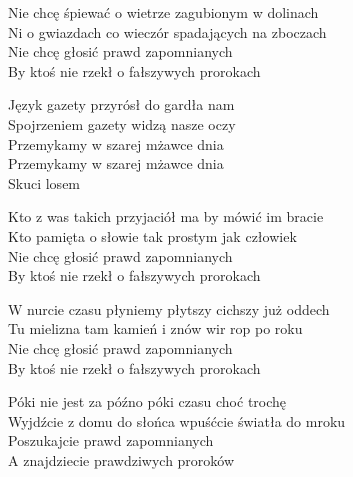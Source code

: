 
\begin{text}
    Nie chcę śpiewać o wietrze zagubionym w dolinach\\
    Ni o gwiazdach co wieczór spadających na zboczach\\
    Nie chcę głosić prawd zapomnianych\\
    By ktoś nie rzekł o fałszywych prorokach

    \vin Język gazety przyrósł do gardła nam\\
    \vin Spojrzeniem gazety widzą nasze oczy\\
    \vin Przemykamy w szarej mżawce dnia\\
    \vin Przemykamy w szarej mżawce dnia\\
    \vin Skuci losem

    Kto z was takich przyjaciół ma by mówić im bracie\\
    Kto pamięta o słowie tak prostym jak człowiek\\
    Nie chcę głosić prawd zapomnianych\\
    By ktoś nie rzekł o fałszywych prorokach

    W nurcie czasu płyniemy płytszy cichszy już oddech\\
    Tu mielizna tam kamień i znów wir rop po roku\\
    Nie chcę głosić prawd zapomnianych\\
    By ktoś nie rzekł o fałszywych prorokach

    Póki nie jest za późno póki czasu choć trochę\\
    Wyjdźcie z domu do słońca wpuśćcie światła do mroku\\
    Poszukajcie prawd zapomnianych\\
    A znajdziecie prawdziwych proroków
\end{text}
\begin{chord}

\end{chord}